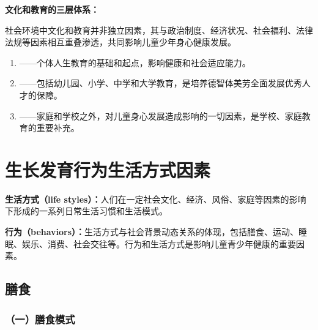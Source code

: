 \begin{keybox}
\textbf{文化和教育的三层体系：}

社会环境中文化和教育并非独立因素，其与政治制度、经济状况、社会福利、法律法规等因素相互重叠渗透，共同影响儿童少年身心健康发展。

\begin{enumerate}[leftmargin=*]
    \item {}——个体人生教育的基础和起点，影响健康和社会适应能力。
    \item {}——包括幼儿园、小学、中学和大学教育，是培养德智体美劳全面发展优秀人才的保障。
    \item {}——家庭和学校之外，对儿童身心发展造成影响的一切因素，是学校、家庭教育的重要补充。
\end{enumerate}
\end{keybox}

\section{生长发育行为生活方式因素}

\begin{defbox}
\textbf{生活方式（life styles）：}人们在一定社会文化、经济、风俗、家庭等因素的影响下形成的一系列日常生活习惯和生活模式。

\textbf{行为（behaviors）：}生活方式与社会背景动态关系的体现，包括膳食、运动、睡眠、娱乐、消费、社会交往等。行为和生活方式是影响儿童青少年健康的重要因素。
\end{defbox}

\subsection{膳食}

\subsubsection{（一）膳食模式}


